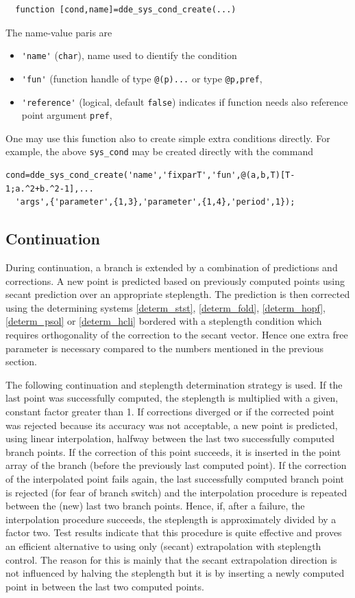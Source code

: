 \documentclass[10pt]{scrartcl}
\newcommand{\blist}[1]{\mbox{\lstinline!#1!}}
\begin{document}
{\begin{lstlisting}
  function [cond,name]=dde_sys_cond_create(...)
\end{lstlisting}
The name-value paris are
\begin{itemize}
\item \blist{'name'} (\blist{char}), name used to dientify the condition
\item \blist{'fun'} (function handle of type \blist{@(p)...} or type \blist{@p,pref},
\item \blist{'reference'} (logical, default \blist{false}) indicates
  if function needs also reference point argument \blist{pref},
\end{itemize}
One may use this function also to create simple extra conditions directly. For example, the above \blist{sys_cond} may be created directly with the command
\begin{lstlisting}
cond=dde_sys_cond_create('name','fixparT','fun',@(a,b,T)[T-1;a.^2+b.^2-1],...
  'args',{'parameter',{1,3},'parameter',{1,4},'period',1});
\end{lstlisting}

\subsection{Continuation}\label{continuation}

During continuation, a branch is extended by a combination of
predictions and corrections.  A new point is predicted based on
previously computed points using secant prediction over an appropriate
steplength. The prediction is then corrected using the determining
systems \eqref{determ_stst}, \eqref{determ_fold}, \eqref{determ_hopf},
\eqref{determ_psol} or \eqref{determ_hcli} bordered with a steplength
condition which requires orthogonality of the correction to the secant
vector.  Hence one extra free parameter is necessary compared to the
numbers mentioned in the previous section.
 
The following continuation and steplength determination strategy is
used.  If the last point was successfully computed, the steplength is
multiplied with a given, constant factor greater than 1.  If
corrections diverged or if the corrected point was rejected because
its accuracy was not acceptable, a new point is predicted, using
linear interpolation, halfway between the last two successfully
computed branch points.  If the correction of this point succeeds, it
is inserted in the point array of the branch (before the previously
last computed point).  If the correction of the interpolated point
fails again, the last successfully computed branch point is rejected
(for fear of branch switch) and the interpolation procedure is
repeated between the (new) last two branch points. Hence, if, after a
failure, the interpolation procedure succeeds, the steplength is
approximately divided by a factor two. Test results indicate that this
procedure is quite effective and proves an efficient alternative to
using only (secant) extrapolation with steplength control.  The reason
for this is mainly that the secant extrapolation direction is not
influenced by halving the steplength but it is by inserting a newly
computed point in between the last two computed points.

}
\end{document}
